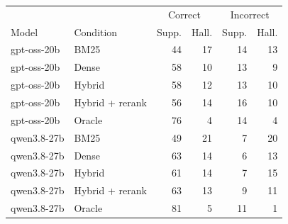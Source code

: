 \begin{tabular}{@{}llrrrr@{}}
\toprule
 &  & \multicolumn{2}{c}{Correct} & \multicolumn{2}{c}{Incorrect} \\
Model & Condition & Supp. & Hall. & Supp. & Hall. \\
\midrule
gpt-oss-20b & BM25 & 44 & 17 & 14 & 13 \\
gpt-oss-20b & Dense & 58 & 10 & 13 & 9 \\
gpt-oss-20b & Hybrid & 58 & 12 & 13 & 10 \\
gpt-oss-20b & Hybrid + rerank & 56 & 14 & 16 & 10 \\
gpt-oss-20b & Oracle & 76 & 4 & 14 & 4 \\
\midrule
qwen3.8-27b & BM25 & 49 & 21 & 7 & 20 \\
qwen3.8-27b & Dense & 63 & 14 & 6 & 13 \\
qwen3.8-27b & Hybrid & 61 & 14 & 7 & 15 \\
qwen3.8-27b & Hybrid + rerank & 63 & 13 & 9 & 11 \\
qwen3.8-27b & Oracle & 81 & 5 & 11 & 1 \\
\bottomrule
\end{tabular}
